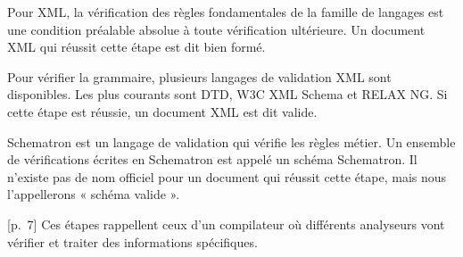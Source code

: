 {{} {
    \item[][---] Pour XML, la vérification des règles fondamentales de la famille de langages est une condition préalable absolue à toute vérification ultérieure. Un document XML qui réussit cette étape est dit bien formé.
    \item[][---] Pour vérifier la grammaire, plusieurs langages de validation XML sont disponibles. Les plus courants sont DTD, W3C XML Schema et RELAX NG. Si cette étape est réussie, un document XML est dit valide. 
    \item[][---] Schematron est un langage de validation qui vérifie les règles métier. Un ensemble de vérifications écrites en Schematron est appelé un schéma Schematron. Il n'existe pas de nom officiel pour un document qui réussit cette étape, mais nous l'appellerons « schéma valide ».
}{[p.~7]}
Ces étapes rappellent ceux d'un compilateur où différents analyseurs vont vérifier et traiter des informations spécifiques.
}{}

